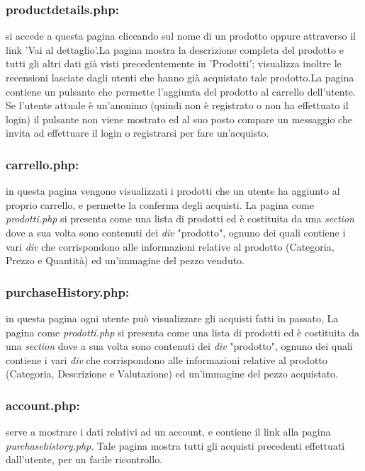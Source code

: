 \subsubsection{productdetails.php:} \Spazio si accede a questa pagina cliccando sul nome di un prodotto oppure attraverso il link 'Vai al dettaglio'.\newline La pagina mostra la descrizione completa del prodotto e tutti gli altri dati già visti precedentemente in 'Prodotti'; visualizza inoltre le recensioni lasciate dagli utenti che hanno già acquistato tale prodotto.\newline La pagina contiene un pulsante che permette l'aggiunta del prodotto al carrello dell'utente. Se l'utente attuale è un'anonimo (quindi non è registrato o non ha effettuato il login) il pulsante non viene mostrato ed al suo posto compare un messaggio che invita ad effettuare il login o registrarsi per fare un'acquisto. 

\subsubsection{carrello.php:} \Spazio in questa pagina vengono visualizzati i prodotti che un utente ha aggiunto al proprio carrello, e permette la conferma degli acquisti. La pagina come \emph{prodotti.php} si presenta come una lista di prodotti ed è costituita da una \emph{section} dove a sua volta sono contenuti dei \emph{div} "prodotto", ognuno dei quali contiene i vari \emph{div} che corrispondono alle informazioni relative al prodotto (Categoria, Prezzo e Quantità) ed un'immagine del pezzo venduto.

\subsubsection{purchaseHistory.php:} \Spazio
in questa pagina ogni utente può visualizzare gli acquisti fatti in passato, La pagina come \emph{prodotti.php} si presenta come una lista di prodotti ed è costituita da una \emph{section} dove a sua volta sono contenuti dei \emph{div} "prodotto", ognuno dei quali contiene i vari \emph{div} che corrispondono alle informazioni relative al prodotto (Categoria, Descrizione e Valutazione) ed un'immagine del pezzo acquistato.

\subsubsection{account.php:} \Spazio serve a mostrare i dati relativi ad un account, e contiene il link alla pagina \textit{purchasehistory.php}.
Tale pagina mostra tutti gli acquisti precedenti effettuati dall'utente, per un facile ricontrollo.

